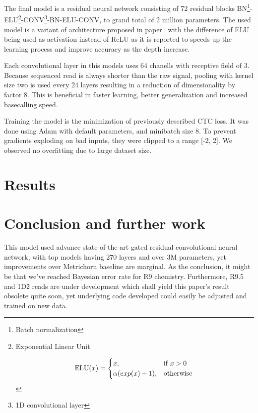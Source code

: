\documentclass[runningheads,a4paper]{llncs}
\begin{document}
The final model is a residual neural network consisting of 72 residual blocks BN\footnote{Batch normalization}-ELU\footnote{Exponential Linear Unit

\begin{equation*}
\text{ELU}(x)=
    \begin{cases}
        x, & \text{if}\ x>0 \\
        \alpha (exp(x) - 1), & \text{otherwise}
        \end{cases}    \\
\end{equation*}

}-CONV\footnote{1D convolutional layer}-BN-ELU-CONV, to grand total of 2 million parameters. The used model is a variant of architecture proposed in paper~\cite{identitet} with the difference of ELU being used as activation instead of ReLU as it is reported \cite{resnet-elu} to speeds up the learning process and improve accuracy as the depth increase.

Each convolutional layer in this models uses 64 chanells with receptive field of 3. Because sequenced read is always shorter than the raw signal, pooling with kernel size two is used every 24 layers resulting in a reduction of dimensionality by factor 8. This is beneficial in faster learning, better generalization and increased basecalling speed.

Training the model is the minimization of previously described CTC loss. It was done using Adam \cite{adam} with default parameters, and minibatch size 8. To prevent gradients exploding on bad inputs, they were clipped to a range [-2, 2]. We observed no overfitting due to large dataset size.

\section{Results}

\section{Conclusion and further work}

This model used advance state-of-the-art gated residual convolutional neural network, with top models having 270 layers and over 3M parameters, yet improvements over Metrichorn baseline are marginal. As the conclusion, it might be that we've reached Bayesian error rate for R9 chemistry. Furthermore, R9.5 and 1D\^2 reads are under development which shall yield this paper's result obsolete quite soon, yet underlying code developed could easily be adjusted and trained on new data.
\end{document}
